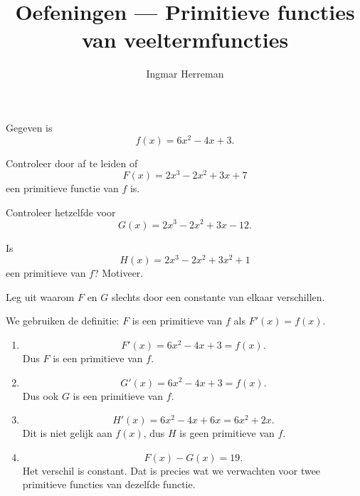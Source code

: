 \documentclass{ximera}
\title{Oefeningen — Primitieve functies van veeltermfuncties}
\author{Ingmar Herreman}
\begin{document}













\begin{oefening}{\oefB\ESS}

Gegeven is
\[
f(x)=6x^2-4x+3.
\]

\begin{question}
Controleer door af te leiden of
\[
F(x)=2x^3-2x^2+3x+7
\]
een primitieve functie van $f$ is.
\end{question}

\begin{question}
Controleer hetzelfde voor
\[
G(x)=2x^3-2x^2+3x-12.
\]
\end{question}

\begin{question}
Is
\[
H(x)=2x^3-2x^2+3x^2+1
\]
een primitieve van $f$? Motiveer.
\end{question}

\begin{question}
Leg uit waarom $F$ en $G$ slechts door een constante van elkaar verschillen.
\end{question}

\begin{oplossing}

We gebruiken de definitie: $F$ is een primitieve van $f$ als $F'(x)=f(x)$.

\begin{enumerate}
\item
\[
F'(x)=6x^2-4x+3=f(x).
\]
Dus $F$ is een primitieve van $f$.

\item
\[
G'(x)=6x^2-4x+3=f(x).
\]
Dus ook $G$ is een primitieve van $f$.

\item
\[
H'(x)=6x^2-4x+6x=6x^2+2x.
\]
Dit is niet gelijk aan $f(x)$, dus $H$ is geen primitieve van $f$.

\item
\[
F(x)-G(x)=19.
\]
Het verschil is constant. Dat is precies wat we verwachten voor twee primitieve functies van dezelfde functie.
\end{enumerate}

\end{oplossing}

\end{oefening}
\end{document}
